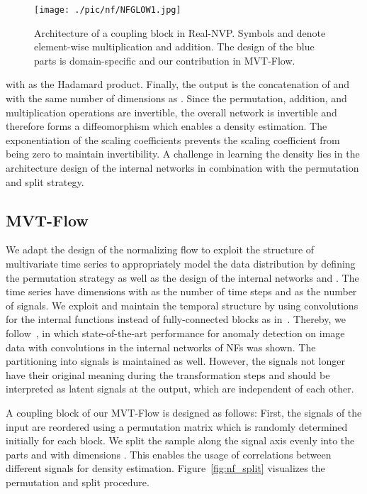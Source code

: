 \documentclass[journal]{IEEEtran}
\begin{document}
\begin{figure}[]
    \centering
    \texttt{[image: ./pic/nf/NFGLOW1.jpg]}
    \caption{Architecture of a coupling block in Real-NVP.
    Symbols  and  denote element-wise multiplication and addition.
    The design of the blue parts is domain-specific and our contribution in MVT-Flow.}
    \label{fig:realnvp}
    \vspace{-2mm}
\end{figure}




with  as the Hadamard product.
Finally, the output  is the concatenation of  and  with the same number of dimensions as .
{Since the permutation, addition, and multiplication operations are invertible, the overall network is invertible and therefore forms a diffeomorphism which enables a density estimation.}
The exponentiation of the scaling coefficients prevents the scaling coefficient from being zero to maintain invertibility.
A challenge in learning the density lies in the architecture design of the internal networks in combination with the permutation and split strategy.

\subsection{MVT-Flow}
\label{sec:mvtflow}
We adapt the design of the normalizing flow to exploit the structure of multivariate time series to appropriately model the data distribution {by defining the permutation strategy as well as the design of the internal networks  and .}
The time series have dimensions  with  as the number of time steps and  as the number of signals.
We exploit and maintain the temporal structure by using convolutions for the internal functions instead of fully-connected blocks as in~\cite{nf_time_series}.
{Thereby, we follow~\cite{csflow, ast}, in which state-of-the-art performance for anomaly detection on image data with convolutions in the internal networks of NFs was shown.}
The partitioning into signals is maintained as well.
However, the signals not longer have their original meaning during the transformation steps and should be interpreted as latent signals at the output, which are independent of each other.

A coupling block of our MVT-Flow is designed as follows:
First, the signals of the input are reordered using a permutation matrix  which is randomly determined initially for each block.
We split the sample along the signal axis evenly into the parts  and  with dimensions .
This enables the usage of correlations between different signals for density estimation.
Figure~\ref{fig:nf_split} visualizes the permutation and split procedure.
\end{document}
